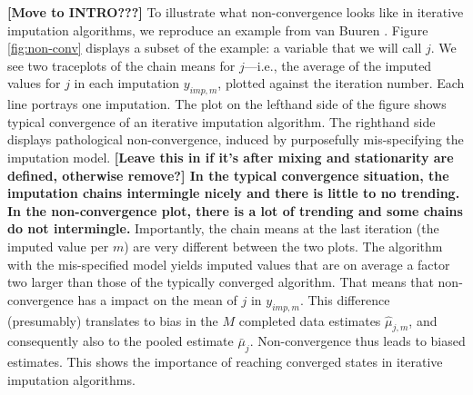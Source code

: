 \documentclass[Royal,times,sageh]{sagej}
\begin{document}
\textbf{{[}Move to INTRO???{]}} To illustrate what non-convergence looks
like in iterative imputation algorithms, we reproduce an example from
van Buuren \citeyearpar[\(\S\) 6.5.2]{buur18}. Figure \ref{fig:non-conv}
displays a subset of the example: a variable that we will call \(j\). We
see two traceplots of the chain means for \(j\)---i.e., the average of
the imputed values for \(j\) in each imputation \(y_{imp,m}\), plotted
against the iteration number. Each line portrays one imputation. The
plot on the lefthand side of the figure shows typical convergence of an
iterative imputation algorithm. The righthand side displays pathological
non-convergence, induced by purposefully mis-specifying the imputation
model. \textbf{{[}Leave this in if it's after mixing and stationarity
are defined, otherwise remove?{]} In the typical convergence situation,
the imputation chains intermingle nicely and there is little to no
trending. In the non-convergence plot, there is a lot of trending and
some chains do not intermingle.} Importantly, the chain means at the
last iteration (the imputed value per \(m\)) are very different between
the two plots. The algorithm with the mis-specified model yields imputed
values that are on average a factor two larger than those of the
typically converged algorithm. That means that non-convergence has a
impact on the mean of \(j\) in \(y_{imp, m}\). This difference
(presumably) translates to bias in the \(M\) completed data estimates
\(\hat{\mu}_{j,m}\), and consequently also to the pooled estimate
\(\bar{\mu}_j\). Non-convergence thus leads to biased estimates. This
shows the importance of reaching converged states in iterative
imputation algorithms.
\end{document}

